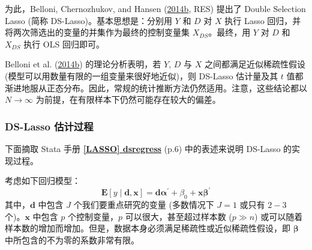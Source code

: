 为此，Belloni, Chernozhukov, and Hansen (\href{http://sci-hub.ren/10.1093/restud/rdt044}{2014b}, RES) 提出了 Double Selection Lasso (简称 DS-Lasso)。基本思想是：分别用 $Y$ 和 $D$ 对 $X$ 执行 Lasso 回归，并将两次筛选出的变量的并集作为最终的控制变量集 $X_{DS}$。最终，用 $Y$ 对 $D$ 和 $X_{DS}$ 执行 OLS 回归即可。

Belloni et al. (\href{http://sci-hub.ren/10.1093/restud/rdt044}{2014b}) 的理论分析表明，若 $Y$, $D$ 与 $X$ 之间都满足近似稀疏性假设 (模型可以用数量有限的一组变量来很好地近似)，则 DS-Lasso 估计量及其 $t$ 值都渐进地服从正态分布。因此，常规的统计推断方法仍然适用。注意，这些结论都以 $N \to \infty$ 为前提，在有限样本下仍然可能存在较大的偏差。%

%


\subsubsection{DS-Lasso 估计过程}
下面摘取 Stata 手册 \href{https://www.stata.com/manuals/lassodsregress.pdf}{\bfseries{[\MakeUppercase{lasso}] dsregress}} (p.6) 中的表述来说明 DS-Lasso 的实现过程。

考虑如下回归模型：
\begin{equation}\label{eq:Lasso-DS-01}
	\mathbf{E}[y \mid \mathbf{d}, \mathbf{x}]=\mathbf{d} \boldsymbol{\alpha}^{\prime}+\beta_{0}+\mathbf{x} \boldsymbol{\beta}^{\prime}
\end{equation}
其中，$\mathbf{d}$ 中包含 $J$ 个我们要重点研究的变量 (多数情况下 $J=1$ 或只有 $2-3$ 个)。$\mathbf{x}$ 中包含 $p$ 个控制变量，$p$ 可以很大，甚至超过样本数 ($p\gg n$) 或可以随着样本数的增加而增加。但是，数据本身必须满足稀疏性或近似稀疏性假设，即 $\boldsymbol{\beta}$ 中所包含的不为零的系数非常有限。

